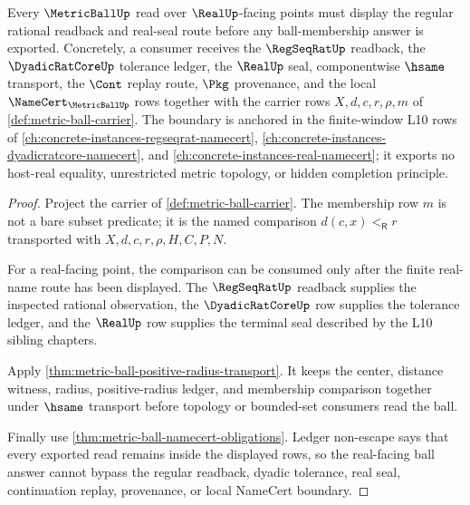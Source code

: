 \begin{theorem}
\label{thm:metric-ball-regseqrat-real-window-boundary}
Every $\MetricBallUp$ read over $\RealUp$-facing points must display the regular rational readback and real-seal route before any ball-membership answer is exported. Concretely, a consumer receives the $\RegSeqRatUp$ readback, the $\DyadicRatCoreUp$ tolerance ledger, the $\RealUp$ seal, componentwise $\hsame$ transport, the $\Cont$ replay route, $\Pkg$ provenance, and the local $\NameCert_{\MetricBallUp}$ rows together with the carrier rows $X,d,c,r,\rho,m$ of \autoref{def:metric-ball-carrier}. The boundary is anchored in the finite-window L10 rows of \autoref{ch:concrete-instances-regseqrat-namecert}, \autoref{ch:concrete-instances-dyadicratcore-namecert}, and \autoref{ch:concrete-instances-real-namecert}; it exports no host-real equality, unrestricted metric topology, or hidden completion principle.
\end{theorem}
\begin{proof}
Project the carrier of \autoref{def:metric-ball-carrier}. The membership row $m$ is not a bare subset predicate; it is the named comparison $d(c,x)<_{\mathsf R}r$ transported with $X,d,c,r,\rho,H,C,P,N$.

For a real-facing point, the comparison can be consumed only after the finite real-name route has been displayed. The $\RegSeqRatUp$ readback supplies the inspected rational observation, the $\DyadicRatCoreUp$ row supplies the tolerance ledger, and the $\RealUp$ row supplies the terminal seal described by the L10 sibling chapters.

Apply \autoref{thm:metric-ball-positive-radius-transport}. It keeps the center, distance witness, radius, positive-radius ledger, and membership comparison together under $\hsame$ transport before topology or bounded-set consumers read the ball.

Finally use \autoref{thm:metric-ball-namecert-obligations}. Ledger non-escape says that every exported read remains inside the displayed rows, so the real-facing ball answer cannot bypass the regular readback, dyadic tolerance, real seal, continuation replay, provenance, or local NameCert boundary.
\end{proof}

